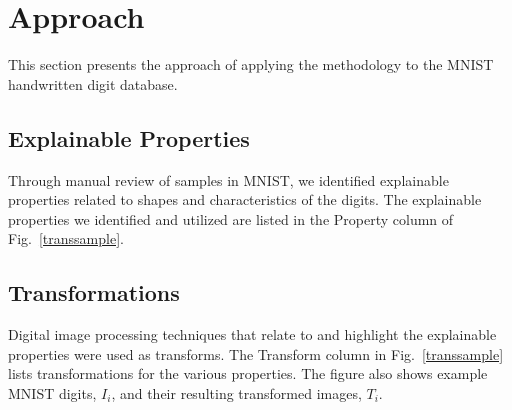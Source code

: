 \documentclass[conference]{IEEEtran}
\begin{document}
\section{Approach}

This section presents the approach of applying the methodology to the MNIST handwritten digit database. 

\subsection{Explainable Properties}

Through manual review of samples in MNIST, we identified explainable properties related to shapes and characteristics of the digits.  The explainable properties we identified and utilized are listed in the Property column of Fig.~\ref{transsample}.

\subsection{Transformations}
 
Digital image processing techniques that relate to and highlight the explainable properties were used as transforms.  The Transform column in Fig.~\ref{transsample} lists transformations for the various properties.  The figure also shows example MNIST digits, $I_i$, and their resulting transformed images, $T_i$.
\end{document}
